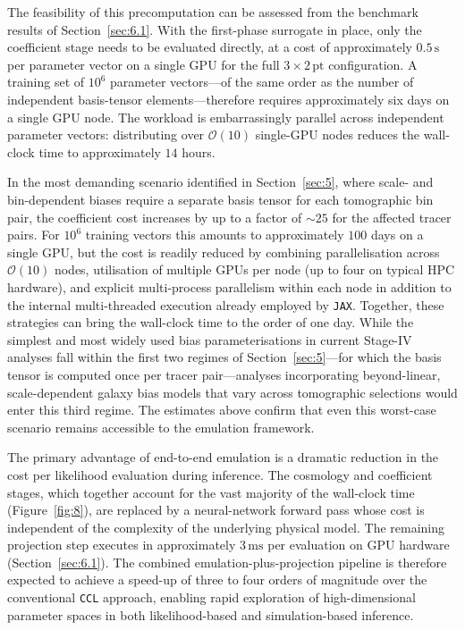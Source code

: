 The feasibility of this precomputation can be assessed from the benchmark results of Section~\ref{sec:6.1}. With the first-phase surrogate in place, only the coefficient stage needs to be evaluated directly, at a cost of approximately \(0.5\,\mathrm{s}\) per parameter vector on a single GPU for the full \(3\times2\,\mathrm{pt}\) configuration. A training set of \(10^6\) parameter vectors---of the same order as the number of independent basis-tensor elements---therefore requires approximately six days on a single GPU node. The workload is embarrassingly parallel across independent parameter vectors: distributing over \(\mathcal{O}(10)\) single-GPU nodes reduces the wall-clock time to approximately \(14\) hours.

In the most demanding scenario identified in Section~\ref{sec:5}, where scale- and bin-dependent biases require a separate basis tensor for each tomographic bin pair, the coefficient cost increases by up to a factor of \(\sim 25\) for the affected tracer pairs. For \(10^6\) training vectors this amounts to approximately \(100\) days on a single GPU, but the cost is readily reduced by combining parallelisation across \(\mathcal{O}(10)\) nodes, utilisation of multiple GPUs per node (up to four on typical HPC hardware), and explicit multi-process parallelism within each node in addition to the internal multi-threaded execution already employed by \texttt{JAX}. Together, these strategies can bring the wall-clock time to the order of one day. While the simplest and most widely used bias parameterisations in current Stage-IV analyses fall within the first two regimes of Section~\ref{sec:5}---for which the basis tensor is computed once per tracer pair---analyses incorporating beyond-linear, scale-dependent galaxy bias models that vary across tomographic selections would enter this third regime. The estimates above confirm that even this worst-case scenario remains accessible to the emulation framework.

The primary advantage of end-to-end emulation is a dramatic reduction in the cost per likelihood evaluation during inference. The cosmology and coefficient stages, which together account for the vast majority of the wall-clock time (Figure~\ref{fig:8}), are replaced by a neural-network forward pass whose cost is independent of the complexity of the underlying physical model. The remaining projection step executes in approximately \(3\,\mathrm{ms}\) per evaluation on GPU hardware (Section~\ref{sec:6.1}). The combined emulation-plus-projection pipeline is therefore expected to achieve a speed-up of three to four orders of magnitude over the conventional \texttt{CCL} approach, enabling rapid exploration of high-dimensional parameter spaces in both likelihood-based and simulation-based inference.

